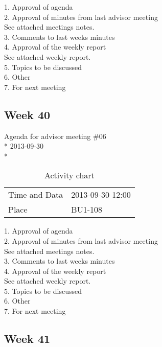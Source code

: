 1. Approval of agenda \\
2. Approval of minutes from last advisor meeting \\
See attached meetings notes. \\
3. Comments to last weeks minutes \\
4. Approval of the weekly report \\
See attached weekly report. \\
5. Topics to be discussed \\
6. Other \\
7. For next meeting \\

\newpage
\subsection{Week 40}

\begin{center}
Agenda for advisor meeting \#06\\*
2013-09-30\\*
\end{center}

\begin{table}[H]
\begin{center}
\begin{tabular}{ l | l }
Time and Data & 2013-09-30 12:00 \\
Place & BU1-108 \\
\end{tabular}
\end{center}
\caption{Activity chart}
\label{table:activityChartAdvisorAgendaWeek40}
\end{table}


1. Approval of agenda \\
2. Approval of minutes from last advisor meeting \\
See attached meetings notes. \\
3. Comments to last weeks minutes \\
4. Approval of the weekly report \\
See attached weekly report. \\
5. Topics to be discussed \\
6. Other \\
7. For next meeting \\

\newpage
\subsection{Week 41}


